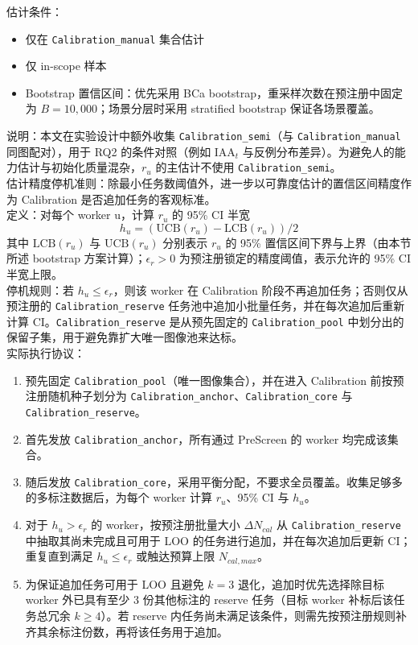估计条件：
\begin{itemize}
    \item 仅在 \texttt{Calibration\_manual} 集合估计
    \item 仅 in-scope 样本
    \item Bootstrap 置信区间：优先采用 BCa bootstrap，重采样次数在预注册中固定为 $B=10,000$；场景分层时采用 stratified bootstrap 保证各场景覆盖。
\end{itemize}
\noindent 说明：本文在实验设计中额外收集 \texttt{Calibration\_semi}（与 \texttt{Calibration\_manual} 同图配对），用于 RQ2 的条件对照（例如 $\mathrm{IAA}_t$ 与反例分布差异）。为避免人的能力估计与初始化质量混杂，$r_u$ 的主估计不使用 \texttt{Calibration\_semi}。
\\ 估计精度停机准则：除最小任务数阈值外，进一步以可靠度估计的置信区间精度作为 Calibration 是否追加任务的客观标准。
\\ 定义：对每个 worker u，计算 $r_u$ 的 95\% CI 半宽
\[h_u=\left(\mathrm{UCB}\left(r_u\right)-\mathrm{LCB}\left(r_u\right)\right)/2\]
其中 $\mathrm{LCB}(r_u)$ 与 $\mathrm{UCB}(r_u)$ 分别表示 $r_u$ 的 95\% 置信区间下界与上界（由本节所述 bootstrap 方案计算）；$\epsilon_r>0$ 为预注册锁定的精度阈值，表示允许的 95\% CI 半宽上限。
\\ 停机规则：若 $h_u\le\epsilon_r$，则该 worker 在 Calibration 阶段不再追加任务；否则仅从预注册的 \texttt{Calibration\_reserve} 任务池中追加小批量任务，并在每次追加后重新计算 CI。\texttt{Calibration\_reserve} 是从预先固定的 \texttt{Calibration\_pool} 中划分出的保留子集，用于避免靠扩大唯一图像池来达标。
\\ 实际执行协议：
\begin{enumerate}
    \item 预先固定 \texttt{Calibration\_pool}（唯一图像集合），并在进入 Calibration 前按预注册随机种子划分为 \texttt{Calibration\_anchor}、\texttt{Calibration\_core} 与 \texttt{Calibration\_reserve}。
    \item 首先发放 \texttt{Calibration\_anchor}，所有通过 PreScreen 的 worker 均完成该集合。
    \item 随后发放 \texttt{Calibration\_core}，采用平衡分配，不要求全员覆盖。收集足够多的多标注数据后，为每个 worker 计算 $r_u$、95\% CI 与 $h_u$。
    \item 对于 $h_u>\epsilon_r$ 的 worker，按预注册批量大小 $\Delta N_{cal}$ 从 \texttt{Calibration\_reserve} 中抽取其尚未完成且可用于 LOO 的任务进行追加，并在每次追加后更新 CI；重复直到满足 $h_u\le\epsilon_r$ 或触达预算上限 $N_{cal,max}$。
    \item 为保证追加任务可用于 LOO 且避免 $k=3$ 退化，追加时优先选择除目标 worker 外已具有至少 3 份其他标注的 reserve 任务（目标 worker 补标后该任务总冗余 $k\ge4$）。若 reserve 内任务尚未满足该条件，则需先按预注册规则补齐其余标注份数，再将该任务用于追加。
\end{enumerate}

